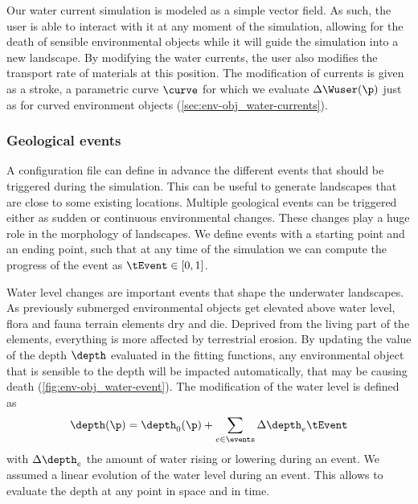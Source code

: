 
Our water current simulation is modeled as a simple vector field. As such, the user is able to interact with it at any moment of the simulation, allowing for the death of sensible environmental objects while it will guide the simulation into a new landscape. By modifying the water currents, the user also modifies the transport rate of materials at this position. The modification of currents is given as a stroke, a parametric curve $\curve$ for which we evaluate $\Delta \Wuser(\p)$ just as for curved environment objects (\cref{sec:env-obj_water-currents}).

\subsubsection{Geological events}
\label{sec:env-obj_events}
A configuration file can define in advance the different events that should be triggered during the simulation. This can be useful to generate landscapes that are close to some existing locations. 
Multiple geological events can be triggered either as sudden or continuous environmental changes. These changes play a huge role in the morphology of landscapes.
We define events with a starting point and an ending point, such that at any time of the simulation we can compute the progress of the event as $\tEvent \in [0, 1]$.

Water level changes are important events that shape the underwater landscapes. As previously submerged environmental objects get elevated above water level, flora and fauna terrain elements dry and die. Deprived from the living part of the elements, everything is more affected by terrestrial erosion. By updating the value of the depth $\depth$ evaluated in the fitting functions, any environmental object that is sensible to the depth will be impacted automatically, that may be causing death (\cref{fig:env-obj_water-event}). The modification of the water level is defined as 
\begin{align*}
    \depth(\p) = \depth_0(\p) + \sum_{e \in \events} \Delta \depth_e \tEvent
\end{align*}
with $\Delta \depth_e$ the amount of water rising or lowering during an event. We assumed a linear evolution of the water level during an event. This allows to evaluate the depth at any point in space and in time.

